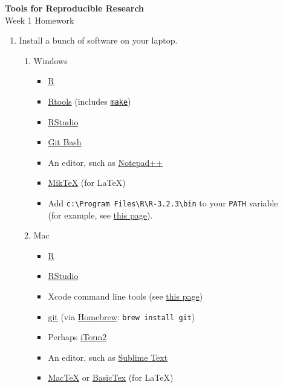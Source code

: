 \documentclass[12pt]{article}
\newcommand{\ttsm}{\tt \small}
\begin{document}
\thispagestyle{empty}

\textbf{Tools for Reproducible Research} \\
Week 1 Homework

\bigskip

\begin{enumerate}
%

\item Install a bunch of software on your laptop.

  \begin{enumerate}
  \item Windows

    \begin{itemize}
    \item \href{http://cran.rstudio.com/bin/windows/base/}{R}
    \item \href{http://cran.rstudio.com/bin/windows/Rtools/Rtools33.exe}{Rtools}
      (includes \href{http://www.gnu.org/software/make/}{\ttsm make})
    \item \href{http://www.rstudio.com/products/rstudio/download/}{RStudio}
    \item \href{http://msysgit.github.io/}{Git Bash}
    \item An editor, such as \href{http://notepad-plus-plus.org/download}{Notepad++}
    \item \href{http://miktex.org/download}{MikTeX} (for LaTeX)
    \item Add {\ttsm c:{\textbackslash}Program Files{\textbackslash}R{\textbackslash}R-3.2.3{\textbackslash}bin}
      to your {\ttsm PATH} variable \\
      (for example, see \href{http://www.howtogeek.com/118594/how-to-edit-your-system-path-for-easy-command-line-access/}{this page}).
    \end{itemize}


  \item Mac

    \begin{itemize}
    \item \href{http://cran.rstudio.com/bin/macosx/}{R}
    \item \href{http://www.rstudio.com/products/rstudio/download}{RStudio}
    \item Xcode command line tools (see
      \href{http://railsapps.github.io/xcode-command-line-tools.html}{this
        page})
    \item \href{http://git-scm.com/download/mac}{git} (via
      \href{http://brew.sh/}{Homebrew}: {\ttsm brew install git})
    \item Perhaps \href{http://iterm2.com/}{iTerm2}
    \item An editor, such as
      \href{http://www.sublimetext.com/}{Sublime Text}
    \item \href{https://tug.org/mactex/}{MacTeX} or
      \href{http://www.tug.org/mactex/morepackages.html}{BasicTex} (for LaTeX)
    \end{itemize}


\end{enumerate}
\end{enumerate}
\end{document}
